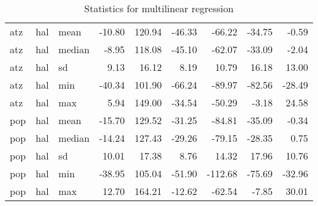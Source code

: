 \begin{table}[ht]
\begin{tabular}{lllrrrrrr}
  atz & hal & mean & -10.80 & 120.94 & -46.33 & -66.22 & -34.75 & -0.59 \\ 
  atz & hal & median & -8.95 & 118.08 & -45.10 & -62.07 & -33.09 & -2.04 \\ 
  atz & hal & sd & 9.13 & 16.12 & 8.19 & 10.79 & 16.18 & 13.00 \\ 
  atz & hal & min & -40.34 & 101.90 & -66.24 & -89.97 & -82.56 & -28.49 \\ 
  atz & hal & max & 5.94 & 149.00 & -34.54 & -50.29 & -3.18 & 24.58 \\ 
  pop & hal & mean & -15.70 & 129.52 & -31.25 & -84.81 & -35.09 & -0.34 \\ 
  pop & hal & median & -14.24 & 127.43 & -29.26 & -79.15 & -28.35 & 0.75 \\ 
  pop & hal & sd & 10.01 & 17.38 & 8.76 & 14.32 & 17.96 & 10.76 \\ 
  pop & hal & min & -38.95 & 105.04 & -51.90 & -112.68 & -75.69 & -32.96 \\ 
  pop & hal & max & 12.70 & 164.21 & -12.62 & -62.54 & -7.85 & 30.01 \\ 
   \hline
\end{tabular}
\caption{Statistics for multilinear regression}
\end{table}

